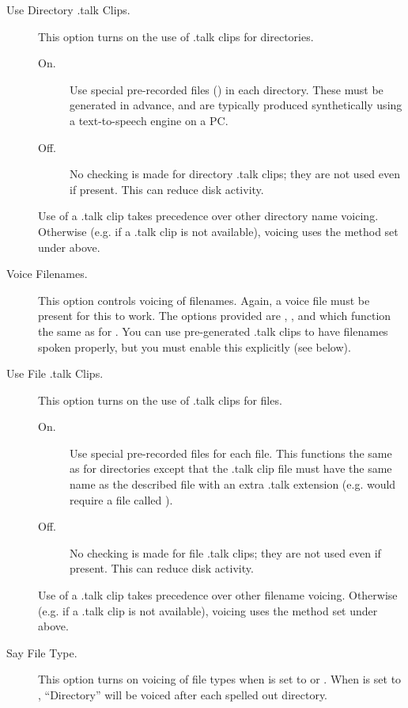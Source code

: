 \begin{description}
  \item[Use Directory .talk Clips.]
    This option turns on the use of .talk clips for directories. 
    \begin{description}
    \item[On.]
      Use special pre-recorded files () in each 
      directory. These must be generated in advance, and are typically 
      produced synthetically using a text-to-speech engine on a PC.
    \item[Off.]
      No checking is made for directory .talk clips; they are not used even if present.
      This can reduce disk activity.
    \end{description}
    Use of a .talk clip takes precedence over other directory name voicing. Otherwise 
    (e.g. if a .talk clip is not available), voicing uses the method set under 
     above.

  \item[Voice Filenames.]
    This option controls voicing of filenames. Again, a voice file must be present 
    for this to work. The options provided are , , 
    and  which function the same as for .
    You can use pre-generated .talk clips to have filenames spoken properly, but
    you must enable this explicitly (see below).

  \item[Use File .talk Clips.]
    This option turns on the use of .talk clips for files. 
    \begin{description}
    \item[On.]
      Use special pre-recorded files for each file.
      This functions the same as for directories except that the .talk clip file 
      must have the same name as the described file with an extra .talk extension 
      (e.g.  would require a file called ).
    \item[Off.]
      No checking is made for file .talk clips; they are not used even if present.
      This can reduce disk activity.
    \end{description}
    Use of a .talk clip takes precedence over other filename voicing. Otherwise 
    (e.g. if  a .talk clip is not available), voicing uses the method set under
      above.

  \item[Say File Type.]
    This option turns on voicing of file types when 
    is set to  or .
    When  is set to , ``Directory''
    will be voiced after each spelled out directory.


\end{description}
